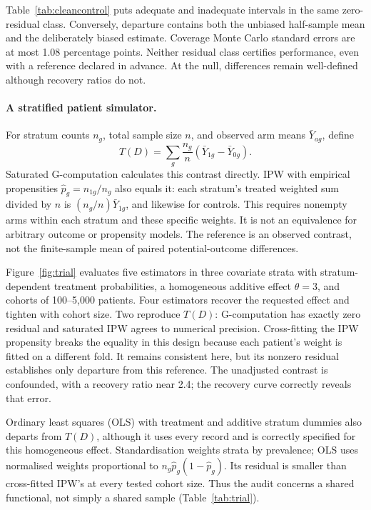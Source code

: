 Table~\ref{tab:cleancontrol} puts adequate and inadequate intervals in the same
zero-residual class. Conversely, departure contains both the unbiased
half-sample mean and the deliberately biased estimate. Coverage Monte Carlo
standard errors are at most 1.08 percentage points. Neither residual class
certifies performance, even with a reference declared in advance. At the
null, differences remain well-defined although recovery ratios do not.

\paragraph{A stratified patient simulator.}
For stratum counts $n_g$, total sample size $n$, and observed arm means
$\bar Y_{ag}$, define
\[
T(D)=\sum_g\frac{n_g}{n}(\bar Y_{1g}-\bar Y_{0g}).
\]
Saturated G-computation \citep{robins1986} calculates this contrast directly.
IPW with empirical propensities $\hat p_g=n_{1g}/n_g$ also equals it: each
stratum's treated weighted sum divided by $n$ is
$(n_g/n)\bar Y_{1g}$, and likewise for controls. This requires nonempty arms
within each stratum and these specific weights. It is not an equivalence for
arbitrary outcome or propensity models. The reference is an observed contrast,
not the finite-sample mean of paired potential-outcome differences.

Figure~\ref{fig:trial} evaluates five estimators in three covariate strata with
stratum-dependent treatment probabilities, a homogeneous additive effect
$\theta=3$, and cohorts of 100--5{,}000 patients. Four estimators recover the
requested effect and tighten with cohort size. Two reproduce $T(D)$:
G-computation has exactly zero residual and saturated IPW agrees to numerical
precision. Cross-fitting the IPW propensity \citep{chernozhukov2018} breaks the
equality in this design because each patient's weight is fitted on a different
fold. It remains consistent here, but its nonzero residual establishes only
departure from this reference. The unadjusted contrast is confounded, with a
recovery ratio near 2.4; the recovery curve correctly reveals that error.

Ordinary least squares (OLS) with treatment and additive stratum dummies also
departs from $T(D)$, although it uses every record and is correctly specified
for this homogeneous effect. Standardisation weights strata by prevalence;
OLS uses normalised weights proportional to $n_g\hat p_g(1-\hat p_g)$.
Its residual is smaller than cross-fitted IPW's at every tested cohort size.
Thus the audit concerns a shared functional, not simply a shared sample
(Table~\ref{tab:trial}).

